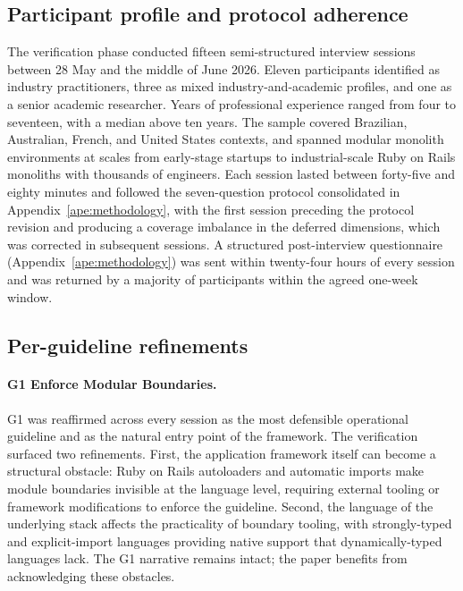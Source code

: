 \subsection*{Participant profile and protocol adherence}

The verification phase conducted fifteen semi-structured interview sessions between 28 May and the middle of June 2026. Eleven participants identified as industry practitioners, three as mixed industry-and-academic profiles, and one as a senior academic researcher. Years of professional experience ranged from four to seventeen, with a median above ten years. The sample covered Brazilian, Australian, French, and United States contexts, and spanned modular monolith environments at scales from early-stage startups to industrial-scale Ruby on Rails monoliths with thousands of engineers. Each session lasted between forty-five and eighty minutes and followed the seven-question protocol consolidated in Appendix~\ref{ape:methodology}, with the first session preceding the protocol revision and producing a coverage imbalance in the deferred dimensions, which was corrected in subsequent sessions. A structured post-interview questionnaire (Appendix~\ref{ape:methodology}) was sent within twenty-four hours of every session and was returned by a majority of participants within the agreed one-week window.

\subsection*{Per-guideline refinements}

\paragraph*{G1 Enforce Modular Boundaries.} G1 was reaffirmed across every session as the most defensible operational guideline and as the natural entry point of the framework. The verification surfaced two refinements. First, the application framework itself can become a structural obstacle: Ruby on Rails autoloaders and automatic imports make module boundaries invisible at the language level, requiring external tooling or framework modifications to enforce the guideline. Second, the language of the underlying stack affects the practicality of boundary tooling, with strongly-typed and explicit-import languages providing native support that dynamically-typed languages lack. The G1 narrative remains intact; the paper benefits from acknowledging these obstacles.

